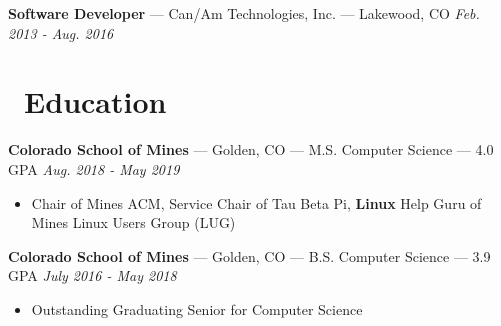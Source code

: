 \documentclass[10pt,letterpaper]{article}
\begin{document}



\vspace{2pt}
{\fontsize{11}{0}
\textbf{Software Developer} --- Can/Am Technologies, Inc. --- Lakewood, CO}
\hfill \textit{Feb. 2013 - Aug. 2016}

\section*{\faBook\ Education}
{\fontsize{11}{0}
\textbf{Colorado School of Mines} --- Golden, CO --- M.S. Computer Science --- 4.0 GPA}
\hfill \textit{Aug. 2018 - May 2019}
\begin{itemize}
    \item Chair of Mines ACM, Service Chair of Tau Beta Pi, \textbf{Linux} Help
        Guru of Mines Linux Users Group (LUG)
\end{itemize}

{\fontsize{11}{0}
\textbf{Colorado School of Mines} --- Golden, CO --- B.S. Computer Science --- 3.9 GPA}
\hfill \textit{July 2016 - May 2018}
\begin{itemize}
    \item Outstanding Graduating Senior for Computer Science
\end{itemize}
\end{document}
